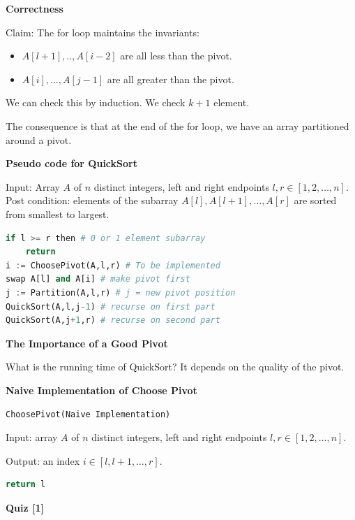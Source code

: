 \documentclass[11pt]{article}
\newcommand{\boldsec}[1]{
    \vspace{11pt}
    \textbf{#1}
    \vspace{11pt}
}
\newcommand{\boldsecbottom}[1]{
    \textbf{#1}
    \vspace{11pt}
}
\begin{document}
\boldsec{Correctness}

Claim: The for loop maintains the invariants:

\begin{itemize}
    \item $A[l+1],..,A[i-2]$ are all less than the pivot.
    \item $A[i], ..., A[j-1]$ are all greater than the pivot.
\end{itemize}
\vspace{11pt}

We can check this by induction. We check $k + 1$ element.

The consequence is that at the end of the for loop, we have an array partitioned around a pivot.

\boldsec{Pseudo code for QuickSort}

Input: Array $A$ of $n$ distinct integers, left and right endpoints $l,r \in [1,2,\dots,n]$.
Post condition: elements of the subarray $A[l],A[l+1],\dots,A[r]$ are sorted from smallest to largest.

\vspace{11pt}
\begin{lstlisting}[language=python, breaklines=true]
if l >= r then # 0 or 1 element subarray
    return
i := ChoosePivot(A,l,r) # To be implemented
swap A[l] and A[i] # make pivot first
j := Partition(A,l,r) # j = new pivot position
QuickSort(A,l,j-1) # recurse on first part
QuickSort(A,j+1,r) # recurse on second part

\end{lstlisting}
\vspace{11pt}

\boldsecbottom{The Importance of a Good Pivot}

What is the running time of QuickSort? It depends on the quality of the pivot.

\boldsec{Naive Implementation of Choose Pivot}

\texttt{ChoosePivot(Naive Implementation)}

Input: array $A$ of $n$ distinct integers, left and right endpoints $l,r \in [1,2,\dots,n]$.

Output: an index $i \in [l,l+1,\dots,r]$.

\vspace{11pt}
\begin{lstlisting}[language=python, breaklines=true]
return l
\end{lstlisting}

\boldsec{Quiz [1]}
\end{document}
